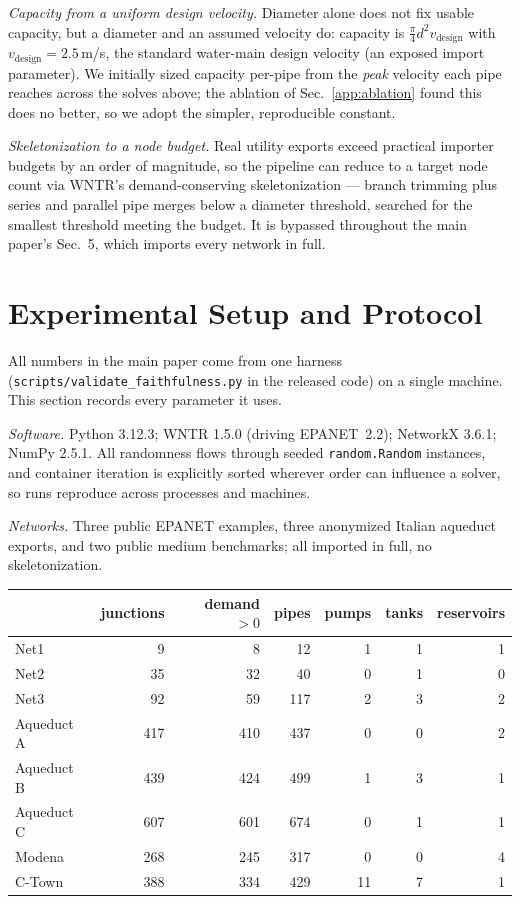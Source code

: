 \documentclass[11pt]{article}
\begin{document}
\emph{Capacity from a uniform design velocity.} Diameter alone does not fix
usable capacity, but a diameter and an assumed velocity do: capacity is
$\tfrac{\pi}{4}d^2 v_{\text{design}}$ with $v_{\text{design}}=2.5$\,m/s, the
standard water-main design velocity (an exposed import parameter). We initially
sized capacity per-pipe from the \emph{peak} velocity each pipe reaches across
the solves above; the ablation of Sec.~\ref{app:ablation} found this does no
better, so we adopt the simpler, reproducible constant.

\emph{Skeletonization to a node budget.} Real utility exports exceed practical
importer budgets by an order of magnitude, so the pipeline can reduce to a target
node count via WNTR's demand-conserving skeletonization --- branch trimming plus
series and parallel pipe merges below a diameter threshold, searched for the
smallest threshold meeting the budget. It is bypassed throughout the main paper's
Sec.~5, which imports every network in full.

\section{Experimental Setup and Protocol}\label{app:repro}

All numbers in the main paper come from one harness
(\texttt{scripts/validate\_faithfulness.py} in the released code) on a single
machine. This section records every parameter it uses.

\emph{Software.} Python 3.12.3; WNTR 1.5.0 (driving EPANET~2.2); NetworkX 3.6.1;
NumPy 2.5.1. All randomness flows through seeded \texttt{random.Random}
instances, and container iteration is explicitly sorted wherever order can
influence a solver, so runs reproduce across processes and machines.

\emph{Networks.} Three public EPANET examples, three anonymized Italian aqueduct
exports, and two public medium benchmarks; all imported in full, no
skeletonization.

\begin{center}
\begin{tabular}{lrrrrrr}
\toprule
 & junctions & demand $>0$ & pipes & pumps & tanks & reservoirs\\
\midrule
Net1 & 9 & 8 & 12 & 1 & 1 & 1\\
Net2 & 35 & 32 & 40 & 0 & 1 & 0\\
Net3 & 92 & 59 & 117 & 2 & 3 & 2\\
Aqueduct A & 417 & 410 & 437 & 0 & 0 & 2\\
Aqueduct B & 439 & 424 & 499 & 1 & 3 & 1\\
Aqueduct C & 607 & 601 & 674 & 0 & 1 & 1\\
Modena & 268 & 245 & 317 & 0 & 0 & 4\\
C-Town & 388 & 334 & 429 & 11 & 7 & 1\\
\bottomrule
\end{tabular}
\end{center}
\end{document}

